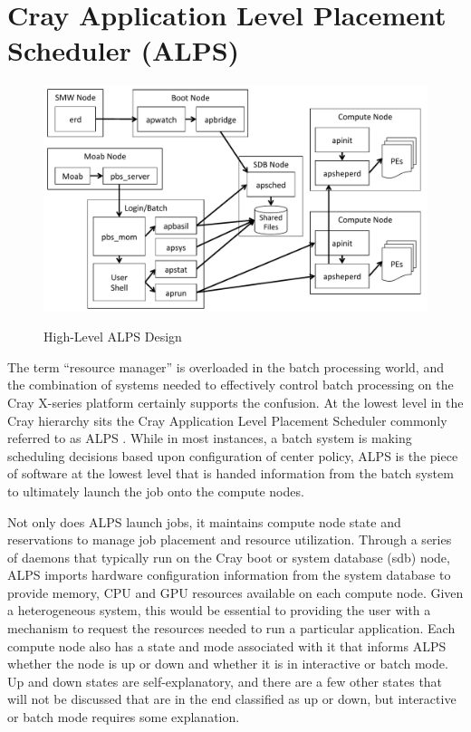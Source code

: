 \section{Cray Application Level Placement Scheduler (ALPS)}

\begin{figure}
  \centering
  \includegraphics[width=6.5in]{figures/alps-hilevel.pdf}\\
  \caption{High-Level ALPS Design}\label{fig:alps-hilevel}
\end{figure}

The term ``resource manager'' is overloaded in the batch processing world, and
the combination of systems needed to effectively control batch processing on
the Cray X-series platform certainly supports the confusion.  At the lowest
level in the Cray hierarchy sits the Cray Application Level Placement Scheduler
commonly referred to as ALPS \cite{alps}.  While in most instances, a batch
system is making scheduling decisions based upon configuration of center
policy, ALPS is the piece of software at the lowest level that is handed
information from the batch system to ultimately launch the job onto the compute
nodes.

Not only does ALPS launch jobs, it maintains compute node state and
reservations to manage job placement and resource utilization.  Through a
series of daemons that typically run on the Cray boot or system database (sdb)
node, ALPS imports hardware configuration information from the system database
to provide memory, CPU and GPU resources available on each compute node.  Given
a heterogeneous system, this would be essential to providing the user with a
mechanism to request the resources needed to run a particular application.
Each compute node also has a state and mode associated with it that informs
ALPS whether the node is up or down and whether it is in interactive or batch
mode.  Up and down states are self-explanatory, and there are a few other
states that will not be discussed that are in the end classified as up or down,
but interactive or batch mode requires some explanation.  

